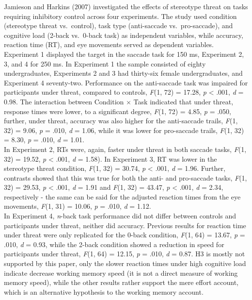 \documentclass[
  stu, a4paper,floatsintext]{apa7}
\begin{document}
Jamieson and Harkins (2007) investigated the effects of stereotype threat on tasks requiring inhibitory control across four experiments.
The study used condition (stereotype threat vs.~control), task type (anti-saccade vs.~pro-saccade), and cognitive load (2-back vs.~0-back task) as independent variables, while accuracy, reaction time (RT), and eye movements served as dependent variables.
Experiment 1 displayed the target in the saccade task for 150 ms, Experiment 2, 3, and 4 for 250 ms.
In Experiment 1 the sample consisted of eighty undergraduates, Experiments 2 and 3 had thirty-six female undergraduates, and Experiment 4 seventy-two.
Performance on the anti-saccade task was impaired for participants under threat, compared to controls, \emph{F}(1, 72) = 17.28, \emph{p} \textless{} .001, \emph{d} = 0.98.
The interaction between Condition \(\times\) Task indicated that under threat, response times were lower, to a significant degree, \emph{F}(1, 72) = 4.85, \emph{p} = .050, further, under threat, accuracy was also higher for the anti-saccade trails, \emph{F}(1, 32) = 9.06, \emph{p} = .010, \emph{d} = 1.06, while it was lower for pro-saccade trails, \emph{F}(1, 32) = 8.30, \emph{p} = .010, \emph{d} = 1.01.\\
In Experiment 2, RTs were, again, faster under threat in both saccade tasks, \emph{F}(1, 32) = 19.52, \emph{p} \textless{} .001, \emph{d} = 1.58).
In Experiment 3, RT was lower in the stereotype threat condition, \emph{F}(1, 32) = 30.74, \emph{p} \textless{} .001, \emph{d} = 1.96.
Further, contrasts showed that this was true for both the anti- and pro-saccade tasks, \emph{F}(1, 32) = 29.53, \emph{p} \textless{} .001, \emph{d} = 1.91 and \emph{F}(1, 32) = 43.47, \emph{p} \textless{} .001, \emph{d} = 2.34, respectively - the same can be said for the adjusted reaction times from the eye movements, \emph{F}(1, 31) = 10.06, \emph{p} = .010, \emph{d} = 1.12.\\
In Experiment 4, \emph{n}-back task performance did not differ between controls and participants under threat, neither did accuracy.
Previous results for reaction time under threat were only replicated for the 0-back condition, \emph{F}(1, 64) = 13.67, \emph{p} = .010, \emph{d} = 0.93, while the 2-back condition showed a reduction in speed for participants under threat, \emph{F}(1, 64) = 12.15, \emph{p} = .010, \emph{d} = 0.87.
H3 is mostly not supported by this paper, only the slower reaction times under high cognitive load indicate decrease working memory speed (it is not a direct measure of working memory speed), while the other results rather support the mere effort account, which is an alternative hypothesis to the working memory account.
\end{document}
